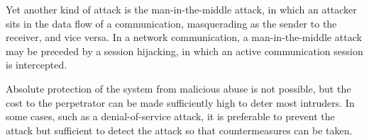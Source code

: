 Yet another kind of attack is the man-in-the-middle attack, in which an attacker sits in the data flow of a communication, masquerading as the sender to the receiver, and vice versa.
In a network communication, a man-in-the-middle attack may be preceded by a session hijacking, in which an active communication session is intercepted.

Absolute protection of the system from malicious abuse is not possible, but the cost to the perpetrator can be made sufficiently high to deter most intruders.
In some cases, such as a denial-of-service attack, it is preferable to prevent the attack but sufficient to detect the attack so that countermeasures can be taken.

